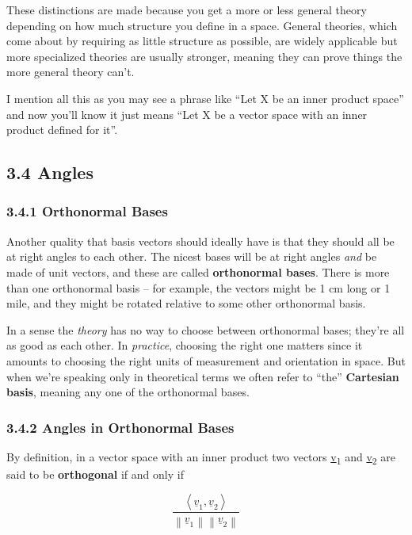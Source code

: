 \documentclass[oneside,english]{amsbook}
\numberwithin{section}{chapter}
\theoremstyle{plain}
\theoremstyle{definition}
\begin{document}
These distinctions are made because you get a more or less general
theory depending on how much structure you define in a space. General
theories, which come about by requiring as little structure as possible,
are widely applicable but more specialized theories are usually
stronger, meaning they can prove things the more general theory can't.

I mention all this as you may see a phrase like ``Let X be an inner
product space'' and now you'll know it just means ``Let X be a vector
space with an inner product defined for it''.

\subsection{3.4 Angles}\label{angles}

\subsubsection{3.4.1 Orthonormal Bases}\label{orthonormal-bases}

Another quality that basis vectors should ideally have is that they
should all be at right angles to each other. The nicest bases will be at
right angles \emph{and} be made of unit vectors, and these are called
\textbf{orthonormal bases}. There is more than one orthonormal basis --
for example, the vectors might be 1 cm long or 1 mile, and they might be
rotated relative to some other orthonormal basis.

In a sense the \emph{theory} has no way to choose between orthonormal
bases; they're all as good as each other. In \emph{practice}, choosing
the right one matters since it amounts to choosing the right units of
measurement and orientation in space. But when we're speaking only in
theoretical terms we often refer to ``the'' \textbf{Cartesian basis},
meaning any one of the orthonormal bases.

\subsubsection{3.4.2 Angles in Orthonormal
	Bases}\label{angles-in-orthonormal-bases}

By definition, in a vector space with an inner product two vectors
\ul{v}\textsubscript{1} and \ul{v}\textsubscript{2} are said to be
\textbf{orthogonal} if and only if

\[\frac{\left\langle {\underline{v}}_{1},{\underline{v}}_{2} \right\rangle}{\left\| {\underline{v}}_{1} \right\|\left\| {\underline{v}}_{2} \right\|}\]
\end{document}
